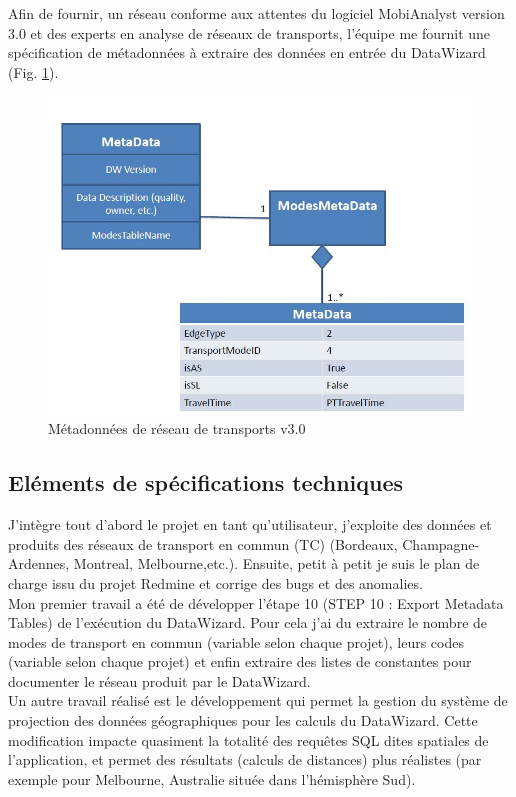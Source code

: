 \begin{itemize}
Afin de fournir, un réseau conforme aux attentes du logiciel MobiAnalyst \og version 3.0 \fg et des experts en analyse de réseaux de transports, l'équipe me fournit une spécification de métadonnées à extraire des données en entrée du DataWizard (Fig. \ref{DW_Metadata}).\\

\begin{figure}[!h]
\centering
\includegraphics[width=12cm]{images/DW_specMetadata.JPG}
\caption{\label{DW_Metadata}Métadonnées de réseau de transports v3.0}
\end{figure} 

\subsection{Eléments de spécifications techniques}

J'intègre tout d'abord le projet en tant qu'utilisateur, j'exploite des données et produits des réseaux de transport en commun (TC) (Bordeaux, Champagne-Ardennes, Montreal, Melbourne,etc.). Ensuite, petit à petit je suis le plan de charge issu du projet Redmine et corrige des bugs et des anomalies.\\

Mon premier travail a été de développer l'étape 10 (STEP 10 : Export Metadata Tables) de l'exécution du DataWizard. Pour cela j'ai du extraire le nombre de modes de transport en commun (variable selon chaque projet), leurs codes (variable selon chaque projet) et enfin extraire des listes de constantes pour documenter le réseau produit par le DataWizard.\\

Un autre travail réalisé est le développement qui permet la gestion du système de projection des données géographiques pour les calculs du DataWizard. Cette modification impacte quasiment la totalité des requêtes SQL dites spatiales de l'application, et permet des résultats (calculs de distances) plus réalistes (par exemple pour Melbourne, Australie située dans l'hémisphère Sud).\\



\end{itemize}
